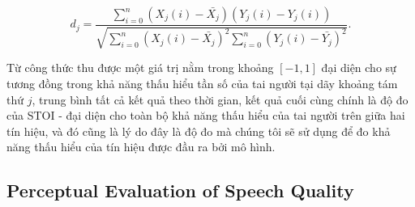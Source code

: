 				\begin{equation}
					d_j = \frac{\sum_{i=0}^n (X_j(i) - \bar{X_j})(Y_j(i) - Y_j(i))}{\sqrt{\sum_{i=0}^n (X_j(i) - \bar{X_j})^2 \sum_{i=0}^n(Y_j(i) - \bar{Y_j})^2}}.
				\label{sound::stoi_dj}
				\end{equation}
			
			Từ công thức  thu được một giá trị nằm trong khoảng $[-1, 1]$ đại diện cho sự tương đồng trong khả năng thấu hiểu tần số của tai người tại dãy khoảng tám thứ $j$, trung bình tất cả kết quả theo thời gian, kết quả cuối cùng chính là độ đo của STOI - đại diện cho toàn bộ khả năng thấu hiểu của tai người trên giữa hai tín hiệu, và đó cũng là lý do đây là độ đo mà chúng tôi sẽ sử dụng để đo khả năng thấu hiểu của tín hiệu được đầu ra bởi mô hình.
		
	\subsection{Perceptual Evaluation of Speech Quality}
	
		
		
